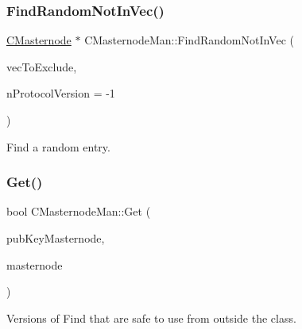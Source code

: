 \mbox{\label{class_c_masternode_man_ab09f6565943d5c40492d260af29100cd}} 
\subsubsection{\texorpdfstring{Find\+Random\+Not\+In\+Vec()}{FindRandomNotInVec()}}
{\footnotesize\ttfamily \mbox{\hyperlink{class_c_masternode}{C\+Masternode}} $\ast$ C\+Masternode\+Man\+::\+Find\+Random\+Not\+In\+Vec (\begin{DoxyParamCaption}\item[{const std\+::vector$<$ C\+Tx\+In $>$ \&}]{vec\+To\+Exclude,  }\item[{int}]{n\+Protocol\+Version = {\ttfamily -\/1} }\end{DoxyParamCaption})}



Find a random entry. 

\mbox{\label{class_c_masternode_man_a041219927e10752e5669a93568103c97}} 
\subsubsection{\texorpdfstring{Get()}{Get()}\hspace{0.1cm}{\footnotesize\ttfamily [1/3]}}
{\footnotesize\ttfamily bool C\+Masternode\+Man\+::\+Get (\begin{DoxyParamCaption}\item[{const \mbox{\hyperlink{class_c_pub_key}{C\+Pub\+Key}} \&}]{pub\+Key\+Masternode,  }\item[{\mbox{\hyperlink{class_c_masternode}{C\+Masternode}} \&}]{masternode }\end{DoxyParamCaption})}



Versions of Find that are safe to use from outside the class. 

\mbox{\label{class_c_masternode_man_ada3c5493b0b52ff5d8fbb041705a9ec8}} 

